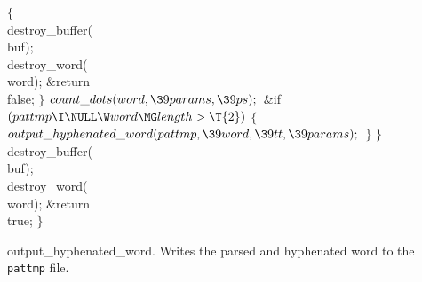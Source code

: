 ${}\{{}$\1\6
\\{destroy\_buffer}(\\{buf});\6
\\{destroy\_word}(\\{word});\6
\&{return} \\{false};\6
\4${}\}{}$\2\6
${}\\{count\_dots}(\\{word},\39\\{params},\39\\{ps});{}$\6
\&{if} ${}(\\{pattmp}\I\NULL\W\\{word}\MG\\{length}>\T{2}){}$\5
${}\{{}$\1\6
${}\\{output\_hyphenated\_word}(\\{pattmp},\39\\{word},\39\\{tt},\39%
\\{params});{}$\6
\4${}\}{}$\2\6
\4${}\}{}$\2\6
\\{destroy\_buffer}(\\{buf});\6
\\{destroy\_word}(\\{word});\6
\&{return} \\{true};\6
\4${}\}{}$\2\par
\fi

output\_hyphenated\_word.
Writes the parsed and hyphenated word to the {\tt pattmp} file.

